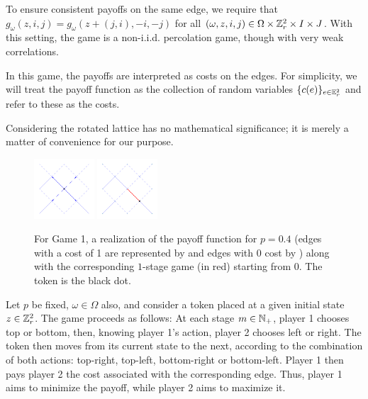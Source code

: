         To ensure consistent payoffs on the same edge, we require that $g_{\omega}(z, i, j) = g_{\omega}(z + (j, i), -i, -j)$ for all $(\omega, z, i, j) \in \Omega \times \mathbb{Z}_r^2 \times I \times J$. With this setting, the game is a non-i.i.d. percolation game, though with very weak correlations.

        In this game, the payoffs are interpreted as costs on the edges. For simplicity, we will treat the payoff function as the collection of random variables $\{c(e)\}_{e \in \mathbb{E}_r^2}$ and refer to these as the costs. 

    	\begin{remark} 
    		Considering the rotated lattice has no mathematical significance; it is merely a matter of convenience for our purpose.
    	\end{remark} 

        \begin{figure}[!hbt]
            \centering
            \includegraphics[width = 0.2\textwidth]{../images/game1/L5grid_arrowsit0p040.png}            
            \includegraphics[width = 0.2\textwidth]{../images/game1/L5opit1p040.png}
            \caption{For Game 1, a realization of the payoff function for $p = 0.4$ (edges with a cost of 1 are represented by \protect\costOne and edges with 0 cost by \protect\costZero) along with the corresponding $1$-stage game (in red) starting from 0. The token is the black dot.}
        \end{figure}

    	Let $p$ be fixed, $\omega \in \Omega$ also, and consider a token placed at a given initial state $z \in \mathbb{Z}_r^2$. The game proceeds as follows: At each stage $m \in \mathbb{N}_+$, player 1 chooses top or bottom, then, knowing player 1's action, player 2 chooses left or right. The token then moves from its current state to the next, according to the combination of both actions: top-right, top-left, bottom-right or bottom-left. Player 1 then pays player 2 the cost associated with the corresponding edge. Thus, player 1 aims to minimize the payoff, while player 2 aims to maximize it.
        

